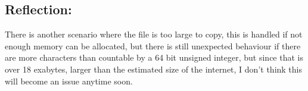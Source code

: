 \documentclass[Lab-C.tex]{subfiles}
\begin{document}
        \subsection*{Reflection:}
            There is another scenario where the file is too large to copy, this is handled
            if not enough memory can be allocated, but there is still unexpected behaviour if there are
            more characters than countable by a 64 bit unsigned integer, but since that is over
            18 exabytes, larger than the estimated size of the internet, 
            I don't think this will become an issue anytime soon.
\end{document}
